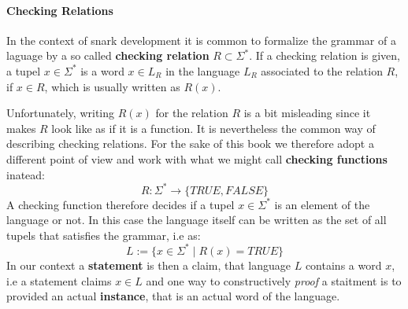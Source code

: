 \paragraph{Checking Relations}
In the context of snark development it is common to formalize the grammar of a laguage by a so called \textbf{checking relation} $R\subset \Sigma^*$. If a checking relation is given, a tupel $x\in \Sigma^*$ is a word $x\in L_R$ in the language $L_R$ associated to the relation $R$, if $x\in R$, which is usually written as $R(x)$.

Unfortunately, writing $R(x)$ for the relation $R$ is a bit misleading since it makes $R$ look like as if it is a function. It is nevertheless the common way of describing checking relations. For the sake of this book we therefore adopt a different point of view and work with what we might call \textbf{checking functions} inatead:
\begin{equation}
R: \Sigma^* \to \{TRUE, FALSE\}
\end{equation}
A checking function therefore decides if a tupel $x\in \Sigma^*$ is an element of the language or not. In this case the language itself can be written as the set of all tupels that satisfies the grammar, i.e as:
\begin{equation}
L := \{x\in \Sigma^*\;|\; R(x)=TRUE\}
\end{equation}
In our context a \textbf{statement} is then a claim, that language $L$ contains a word $x$, i.e a statement claims $x\in L$ and one way to constructively \textit{proof} a staitment is to provided an actual \textbf{instance}, that is an actual word of the language.

